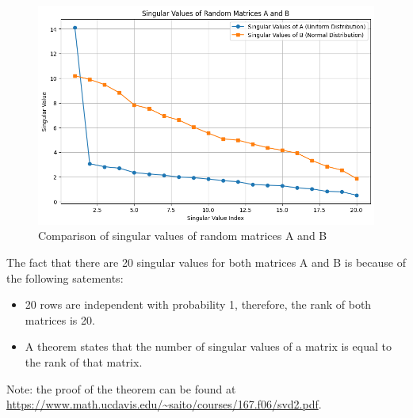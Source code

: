 \documentclass{article}
\begin{document}
\begin{figure}[ht]
    \centering
    \includegraphics[width=1\textwidth]{img/singular_value_index.png}
    \caption{Comparison of singular values of random matrices A and B}
    \label{fig:singular_value_index}
\end{figure}

The fact that there are 20 singular values for both matrices A and B is because of the following satements:

\begin{itemize}
    \item 20 rows are independent with probability 1, therefore, the rank of both matrices is 20.
    \item A theorem states that the number of singular values of a matrix is equal to the rank of that matrix.
\end{itemize}

Note: the proof of the theorem can be found at \\
\url{https://www.math.ucdavis.edu/~saito/courses/167.f06/svd2.pdf}.
\end{document}
